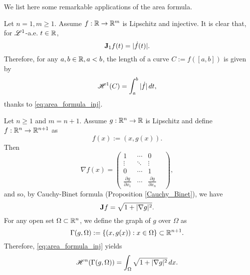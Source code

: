 We list here some remarkable applications of the area formula.

\begin{example}
Let $n = 1, m \ge 1$. Assume $f : \mathbb{R} \to \mathbb{R}^{m}$ is Lipschitz and injective. It is clear that, for $\mathscr{L}^{1}$-a.e. $t \in \mathbb{R}$,
\begin{equation*}
{\bf J}_{1} f(t) = |\dot{f}(t)|. 
\end{equation*}
Therefore, for any $a, b \in \mathbb{R}, a < b$, the length of a curve $C := f([a, b])$ is given by
\begin{equation*}
\mathscr{H}^{1}(C) = \int_{a}^{b} |\dot{f}| \, dt,
\end{equation*}
thanks to \eqref{eq:area_formula_inj}.
\end{example}

\begin{example}
Let $n \ge 1$ and $m = n + 1$. Assume $g: \mathbb{R}^{n} \to \mathbb{R}$ is Lipschitz and define $f: \mathbb{R}^{n} \to \mathbb{R}^{n + 1}$ as $$f(x) := (x, g(x)).$$
Then
\[\nabla f(x) = \begin{pmatrix} 1 & \cdots & 0 & \\ \vdots & \ddots & \vdots \\ 
0 & \cdots & 1 & \\ \frac{\partial g}{\partial x_{1}} & \cdots & \frac{\partial g}{\partial x_{n}} & \end{pmatrix},\]
and so, by Cauchy-Binet formula (Proposition \ref{Cauchy_Binet}), we have
\begin{equation*}
{\bf J} f = \sqrt{1 + |\nabla g|^2}.
\end{equation*}
For any open set $\Omega \subset \mathbb{R}^{n}$, we define the graph of $g$ over $\Omega$ as
$$ \Gamma(g, \Omega) := \{ (x, g(x)) : x \in \Omega \} \subset \mathbb{R}^{n + 1}.$$
Therefore, \eqref{eq:area_formula_inj} yields
\begin{equation*}
\mathscr{H}^{n}(\Gamma(g, \Omega)) = \int_{\Omega} \sqrt{1 + |\nabla g|^{2}} \, dx.
\end{equation*}
\end{example}

